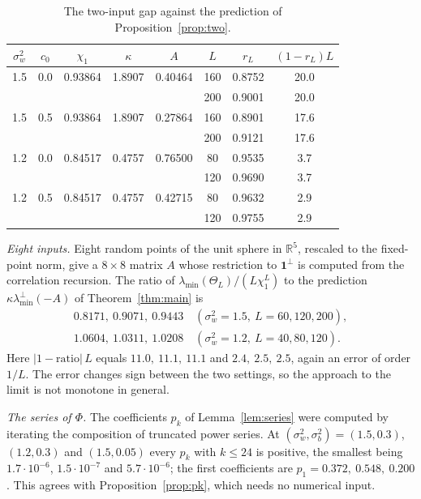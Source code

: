\documentclass[11pt]{amsart}
\theoremstyle{remark}\newtheorem{remark}[theorem]{Remark}
\begin{document}
\begin{table}[ht]
\centering
\begin{tabular}{cccccccc}
\hline
$\sigma_w^2$ & $c_0$ & $\chi_1$ & $\kappa$ & $A$ & $L$ & $r_L$ & $(1-r_L)L$\\
\hline
1.5 & 0.0 & 0.93864 & 1.8907 & 0.40464 & 160 & 0.8752 & 20.0\\
    &     &         &        &         & 200 & 0.9001 & 20.0\\
1.5 & 0.5 & 0.93864 & 1.8907 & 0.27864 & 160 & 0.8901 & 17.6\\
    &     &         &        &         & 200 & 0.9121 & 17.6\\
1.2 & 0.0 & 0.84517 & 0.4757 & 0.76500 & 80  & 0.9535 & 3.7\\
    &     &         &        &         & 120 & 0.9690 & 3.7\\
1.2 & 0.5 & 0.84517 & 0.4757 & 0.42715 & 80  & 0.9632 & 2.9\\
    &     &         &        &         & 120 & 0.9755 & 2.9\\
\hline
\end{tabular}
\caption{The two-input gap against the prediction of Proposition~\ref{prop:two}.}\label{tab:two}
\end{table}

\emph{Eight inputs.} Eight random points of the unit sphere in $\mathbb R^5$, rescaled to the fixed-point norm, give a
$8\times8$ matrix $A$ whose restriction to $\mathbf 1^\perp$ is computed from the correlation recursion. The ratio of
$\lambda_{\min}(\Theta_L)/(L\chi_1^L)$ to the prediction $\kappa\lambda_{\min}^\perp(-A)$ of Theorem~\ref{thm:main} is
\begin{gather*}
0.8171,\ 0.9071,\ 0.9443\quad(\sigma_w^2=1.5,\ L=60,120,200),\\
1.0604,\ 1.0311,\ 1.0208\quad(\sigma_w^2=1.2,\ L=40,80,120).
\end{gather*}
Here $|1-\text{ratio}|\,L$ equals $11.0,\ 11.1,\ 11.1$ and $2.4,\ 2.5,\ 2.5$, again an error of order $1/L$. The
error changes sign between the two settings, so the approach to the limit is not monotone in general.

\emph{The series of $\Phi$.} The coefficients $p_k$ of Lemma~\ref{lem:series} were computed by iterating the
composition of truncated power series. At $(\sigma_w^2,\sigma_b^2)=(1.5,0.3)$, $(1.2,0.3)$ and $(1.5,0.05)$ every
$p_k$ with $k\le24$ is positive, the smallest being $1.7\cdot10^{-6}$, $1.5\cdot10^{-7}$ and $5.7\cdot10^{-6}$; the
first coefficients are $p_1=0.372,\ 0.548,\ 0.200$. This agrees with Proposition~\ref{prop:pk}, which needs no
numerical input.
\end{document}
